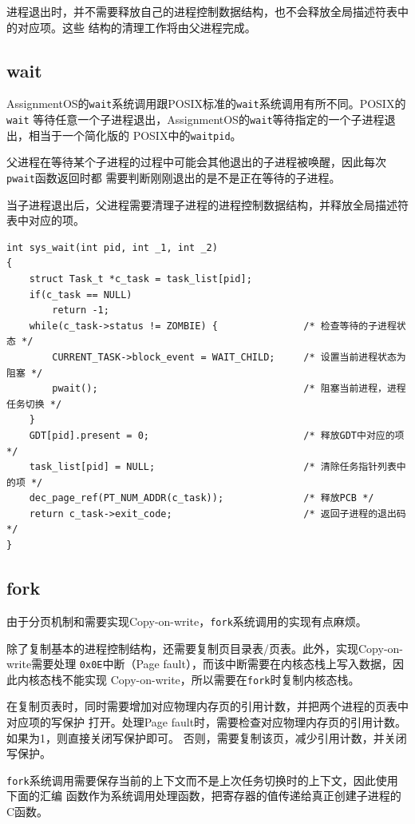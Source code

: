 \documentclass[a4paper, adobefonts]{ctexart}
\begin{document}
进程退出时，并不需要释放自己的进程控制数据结构，也不会释放全局描述符表中的对应项。这些
结构的清理工作将由父进程完成。

\subsection{wait}
AssignmentOS的\verb|wait|系统调用跟POSIX标准的\verb|wait|系统调用有所不同。POSIX的\verb|wait|
等待任意一个子进程退出，AssignmentOS的\verb|wait|等待指定的一个子进程退出，相当于一个简化版的
POSIX中的\verb|waitpid|。

父进程在等待某个子进程的过程中可能会其他退出的子进程被唤醒，因此每次\verb|pwait|函数返回时都
需要判断刚刚退出的是不是正在等待的子进程。

当子进程退出后，父进程需要清理子进程的进程控制数据结构，并释放全局描述符表中对应的项。

\begin{verbatim}
int sys_wait(int pid, int _1, int _2)
{
    struct Task_t *c_task = task_list[pid];
    if(c_task == NULL)
        return -1;
    while(c_task->status != ZOMBIE) {               /* 检查等待的子进程状态 */
        CURRENT_TASK->block_event = WAIT_CHILD;     /* 设置当前进程状态为阻塞 */
        pwait();                                    /* 阻塞当前进程，进程任务切换 */
    }
    GDT[pid].present = 0;                           /* 释放GDT中对应的项 */
    task_list[pid] = NULL;                          /* 清除任务指针列表中的项 */
    dec_page_ref(PT_NUM_ADDR(c_task));              /* 释放PCB */
    return c_task->exit_code;                       /* 返回子进程的退出码 */
}
\end{verbatim}

\subsection{fork}
由于分页机制和需要实现Copy-on-write，\verb|fork|系统调用的实现有点麻烦。

除了复制基本的进程控制结构，还需要复制页目录表/页表。此外，实现Copy-on-write需要处理
\verb|0x0E|中断（Page fault），而该中断需要在内核态栈上写入数据，因此内核态栈不能实现
Copy-on-write，所以需要在\verb|fork|时复制内核态栈。

在复制页表时，同时需要增加对应物理内存页的引用计数，并把两个进程的页表中对应项的写保护
打开。处理Page fault时，需要检查对应物理内存页的引用计数。如果为1，则直接关闭写保护即可。
否则，需要复制该页，减少引用计数，并关闭写保护。

\verb|fork|系统调用需要保存当前的上下文而不是上次任务切换时的上下文，因此使用下面的汇编
函数作为系统调用处理函数，把寄存器的值传递给真正创建子进程的C函数。
\end{document}
